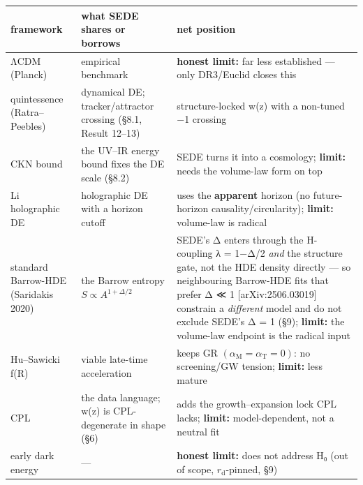\documentclass[
  10pt,
]{article}
\begin{document}
\begin{longtable}[]{@{}
  >{\raggedright\arraybackslash}p{}
  >{\raggedright\arraybackslash}p{}
  >{\raggedright\arraybackslash}p{}@{}}
\toprule\noalign{}
\begin{minipage}[b]{\linewidth}\raggedright
framework
\end{minipage} & \begin{minipage}[b]{\linewidth}\raggedright
what SEDE shares or borrows
\end{minipage} & \begin{minipage}[b]{\linewidth}\raggedright
net position
\end{minipage} \\
\midrule\noalign{}
\endhead
\bottomrule\noalign{}
\endlastfoot
ΛCDM (Planck) & empirical benchmark & \textbf{honest limit:} far less
established --- only DR3/Euclid closes this \\
quintessence (Ratra--Peebles) & dynamical DE; tracker/attractor crossing
(§8.1, Result 12--13) & structure-locked w(z) with a non-tuned −1
crossing \\
CKN bound & the UV--IR energy bound fixes the DE scale (§8.2) & SEDE
turns it into a cosmology; \textbf{limit:} needs the volume-law form on
top \\
Li holographic DE & holographic DE with a horizon cutoff & uses the
\textbf{apparent} horizon (no future-horizon causality/circularity);
\textbf{limit:} volume-law is radical \\
standard Barrow-HDE (Saridakis 2020) & the Barrow entropy
\(S \propto  A^{1+\Delta /2}\) & SEDE's Δ enters through the H-coupling
λ = 1−Δ/2 \emph{and} the structure gate, not the HDE density directly
--- so neighbouring Barrow-HDE fits that prefer Δ ≪ 1
{[}arXiv:2506.03019{]} constrain a \emph{different} model and do not
exclude SEDE's Δ = 1 (§9); \textbf{limit:} the volume-law endpoint is
the radical input \\
Hu--Sawicki f(R) & viable late-time acceleration & keeps GR
\((\alpha _{\mathrm{M}} = \alpha _{\mathrm{T}} = 0)\): no screening/GW
tension; \textbf{limit:} less mature \\
CPL & the data language; w(z) is CPL-degenerate in shape (§6) & adds the
growth--expansion lock CPL lacks; \textbf{limit:} model-dependent, not a
neutral fit \\
early dark energy & --- & \textbf{honest limit:} does not address H₀
(out of scope, \(r_{\mathrm{d}}\)-pinned, §9) \\

\end{longtable}
\end{document}
